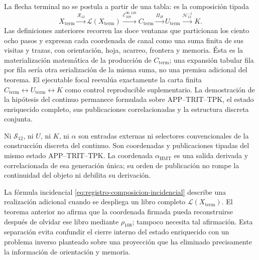 \begin{remark}
La flecha terminal no se postula a partir de una tabla: es la composición
tipada
\[
 X_{\mathrm{term}}
 \xrightarrow{\mathcal R_{12}}\mathscr L(X_{\mathrm{term}})
 \xrightarrow{\mathcal E_{108}^{90,120}}C_{\mathrm{term}}
 \xrightarrow{\Pi_H}U_{\mathrm{term}}
 \xrightarrow{\mathcal H_{12}^{-1}}K .
\]
Las definiciones anteriores recorren las doce ventanas que particionan los
ciento ocho pasos y expresan cada coordenada de canal como una suma finita de
sus visitas y trazas, con orientación, hoja, acarreo, frontera y memoria. Ésta
es la materialización matemática de la producción de
\(C_{\mathrm{term}}\); una expansión tabular fila por fila sería otra
serialización de la misma suma, no una premisa adicional del teorema. El
ejecutable focal reevalúa exactamente la carta finita
\(C_{\mathrm{term}}\leftrightarrow U_{\mathrm{term}}\leftrightarrow K\)
como control reproducible suplementario. La demostración de la hipótesis del
continuo permanece formulada sobre APP--TRIT--TPK, el estado enriquecido
completo, sus publicaciones correlacionadas y la estructura discreta conjunta.
\end{remark}

Ni \(\mathcal S_{12}\), ni \(U\), ni \(K\), ni \(\alpha\) son entradas
externas ni selectores convencionales de la construcción discreta del
continuo. Son coordenadas y publicaciones tipadas del mismo estado
APP--TRIT--TPK. La coordenada \(\alpha_{\mathrm{HMT}}\) es una salida derivada
y correlacionada de esa generación única; su orden de publicación no rompe la
continuidad del objeto ni debilita su derivación.

La fórmula incidencial \eqref{eq:registro-composicion-incidencial} describe
una realización adicional cuando se despliega un libro completo
\(\mathscr L(X_{\mathrm{term}})\). El teorema anterior no afirma que la
coordenada firmada pueda reconstruirse después de olvidar ese libro mediante
\(\rho_{108}\); tampoco necesita tal afirmación. Esta separación evita
confundir el cierre interno del estado enriquecido con un problema inverso
planteado sobre una proyección que ha eliminado precisamente la información
de orientación y memoria.

